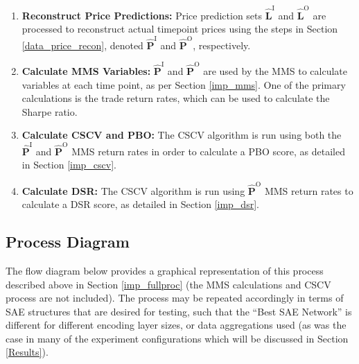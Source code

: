 \documentclass[a4paper,11pt,oneside]{article}
\theoremstyle{plain}
\theoremstyle{definition}
\begin{document}
\begin{enumerate}
		\item \textbf{Reconstruct Price Predictions:} Price prediction sets $\mathbf{\hat{L}}^\mathrm{I}$ and $\mathbf{\hat{L}}^\mathrm{O}$ are processed to reconstruct actual timepoint prices using the steps in Section \ref{data_price_recon}, denoted $\mathbf{\hat{P}}^\mathrm{I}$ and $\mathbf{\hat{P}}^\mathrm{O}$, respectively.
		\item \textbf{Calculate MMS Variables:} $\mathbf{\hat{P}}^\mathrm{I}$ and $\mathbf{\hat{P}}^\mathrm{O}$ are used by the MMS to calculate variables at each time point, as per Section \ref{imp_mms}. One of the primary calculations is the trade return rates, which can be used to calculate the Sharpe ratio.
		\item \textbf{Calculate CSCV and PBO:} The CSCV algorithm is run using both the $\mathbf{\hat{P}}^\mathrm{I}$ and $\mathbf{\hat{P}}^\mathrm{O}$ MMS return rates in order to calculate a PBO score, as detailed in Section \ref{imp_cscv}.
		\item \textbf{Calculate DSR:} The CSCV algorithm is run using $\mathbf{\hat{P}}^\mathrm{O}$ MMS return rates to calculate a DSR score, as detailed in Section \ref{imp_dsr}.
	\end{enumerate}
	
	
	\subsection{Process Diagram}\label{proc_diagram}
	
	The flow diagram below provides a graphical representation of this process described above in Section \ref{imp_fullproc} (the MMS calculations and CSCV process are not included). The process may be repeated accordingly in terms of SAE structures that are desired for testing, such that the ``Best SAE Network'' is different for different encoding layer sizes, or data aggregations used (as was the case in many of the experiment configurations which will be discussed in Section \ref{Results}).
	
\end{document}
